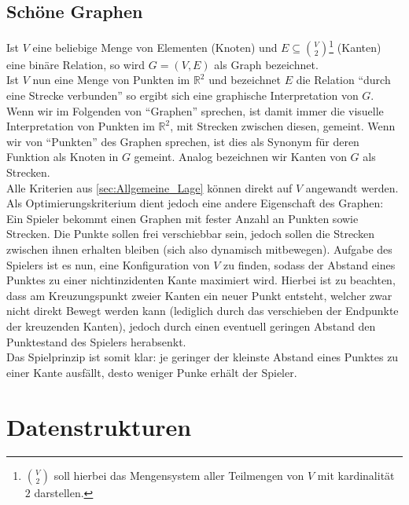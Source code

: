 \documentclass[a4paper,twocolumn]{scrartcl}
\begin{document}
\subsection{Sch\"one Graphen}
Ist $V$ eine beliebige Menge von Elementen (Knoten) und $E\subseteq\binom{V}{2}$\footnote{$\binom{V}{2}$ soll hierbei das
Mengensystem aller Teilmengen von $V$ mit kardinalit\"at $2$ darstellen.} (Kanten) eine bin\"are Relation, so wird
$G=(V,E)$ als Graph bezeichnet.\\
Ist $V$ nun eine Menge von Punkten im $\mathbb{R}^2$ und bezeichnet $E$ die Relation "`durch eine Strecke verbunden"' so
ergibt sich eine graphische Interpretation von $G$. Wenn wir im Folgenden von "`Graphen"' sprechen, ist damit immer die
visuelle Interpretation von Punkten im $\mathbb{R}^2$, mit Strecken zwischen diesen, gemeint. Wenn wir von "`Punkten"'
des Graphen sprechen, ist dies als Synonym f\"ur deren Funktion als Knoten in $G$ gemeint. Analog bezeichnen wir Kanten
von $G$ als Strecken.\\
Alle Kriterien aus \ref{sec:Allgemeine_Lage} k\"onnen direkt auf $V$ angewandt werden. Als Optimierungskriterium
dient jedoch eine andere Eigenschaft des Graphen: Ein Spieler bekommt einen Graphen mit fester Anzahl an Punkten
sowie Strecken. Die Punkte sollen frei verschiebbar sein, jedoch sollen die Strecken zwischen ihnen erhalten bleiben
(sich also dynamisch mitbewegen). Aufgabe des Spielers ist es nun, eine Konfiguration von $V$ zu finden, sodass der
Abstand eines Punktes zu einer nichtinzidenten Kante maximiert wird. Hierbei ist zu beachten, dass am Kreuzungspunkt
zweier Kanten ein neuer Punkt entsteht, welcher zwar nicht direkt Bewegt werden kann (lediglich durch das verschieben
der Endpunkte der kreuzenden Kanten), jedoch durch einen eventuell geringen Abstand den Punktestand des Spielers
herabsenkt.\\
Das Spielprinzip ist somit klar: je geringer der kleinste Abstand eines Punktes zu einer Kante ausf\"allt, desto weniger
Punke erh\"alt der Spieler.

\section{Datenstrukturen}
\end{document}
